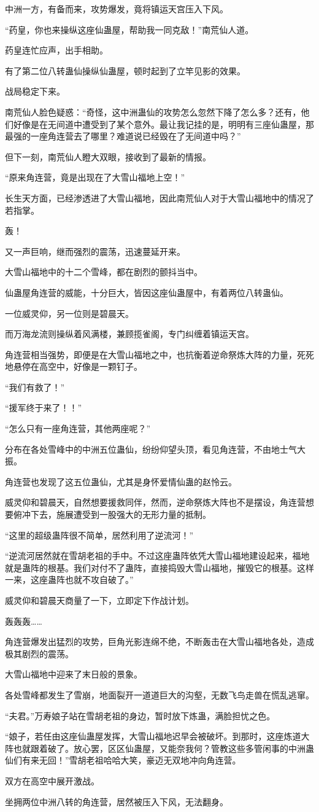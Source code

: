 \begin{this_body}
中洲一方，有备而来，攻势爆发，竟将镇运天宫压入下风。

“药皇，你也来操纵这座仙蛊屋，帮助我一同克敌！”南荒仙人道。

药皇连忙应声，出手相助。

有了第二位八转蛊仙操纵仙蛊屋，顿时起到了立竿见影的效果。

战局稳定下来。

南荒仙人脸色疑惑：“奇怪，这中洲蛊仙的攻势怎么忽然下降了怎么多？还有，他们好像是在无间道中遭受到了某个意外。最让我记挂的是，明明有三座仙蛊屋，那最强的一座角连营去了哪里？难道说已经毁在了无间道中吗？”

但下一刻，南荒仙人瞪大双眼，接收到了最新的情报。

“原来角连营，竟是出现在了大雪山福地上空！”

长生天方面，已经渗透进了大雪山福地，因此南荒仙人对于大雪山福地中的情况了若指掌。

轰！

又一声巨响，继而强烈的震荡，迅速蔓延开来。

大雪山福地中的十二个雪峰，都在剧烈的颤抖当中。

仙蛊屋角连营的威能，十分巨大，皆因这座仙蛊屋中，有着两位八转蛊仙。

一位威灵仰，另一位则是碧晨天。

而万海龙流则操纵着风满楼，兼顾揽雀阁，专门纠缠着镇运天宫。

角连营相当强势，即便是在大雪山福地之中，也抗衡着逆命祭炼大阵的力量，死死地悬停在高空中，好像是一颗钉子。

“我们有救了！”

“援军终于来了！！”

“怎么只有一座角连营，其他两座呢？”

分布在各处雪峰中的中洲五位蛊仙，纷纷仰望头顶，看见角连营，不由地士气大振。

角连营也发现了这五位蛊仙，尤其是身怀爱情仙蛊的赵怜云。

威灵仰和碧晨天，自然想要援救同伴，然而，逆命祭炼大阵也不是摆设，角连营想要俯冲下去，施展遭受到一股强大的无形力量的抵制。

“这里的超级蛊阵很不简单，居然利用了逆流河！”

“逆流河居然就在雪胡老祖的手中。不过这座蛊阵依凭大雪山福地建设起来，福地就是蛊阵的根基。我们对付不了蛊阵，直接捣毁大雪山福地，摧毁它的根基。这样一来，这座蛊阵也就不攻自破了。”

威灵仰和碧晨天商量了一下，立即定下作战计划。

轰轰轰……

角连营爆发出猛烈的攻势，巨角光影连绵不绝，不断轰击在大雪山福地各处，造成极其剧烈的震荡。

大雪山福地中迎来了末日般的景象。

各处雪峰都发生了雪崩，地面裂开一道道巨大的沟壑，无数飞鸟走兽在慌乱逃窜。

“夫君。”万寿娘子站在雪胡老祖的身边，暂时放下炼蛊，满脸担忧之色。

“娘子，若任由这座仙蛊屋发挥，大雪山福地迟早会被破坏。到那时，这座炼道大阵也就跟着破了。放心罢，区区仙蛊屋，又能奈我何？管教这些多管闲事的中洲蛊仙们有来无回！”雪胡老祖哈哈大笑，豪迈无双地冲向角连营。

双方在高空中展开激战。

坐拥两位中洲八转的角连营，居然被压入下风，无法翻身。

\end{this_body}

